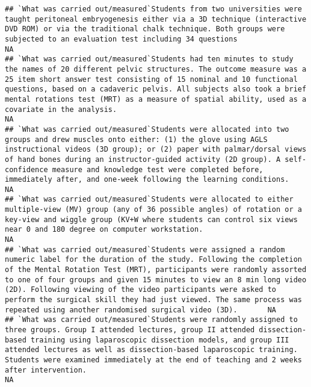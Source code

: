 \documentclass[]{article}
\begin{document}
\begin{verbatim}
## `What was carried out/measured`Students from two universities were taught peritoneal embryogenesis either via a 3D technique (interactive DVD ROM) or via the traditional chalk technique. Both groups were subjected to an evaluation test including 34 questions                                                                                                                                                                                                                    NA
## `What was carried out/measured`Students had ten minutes to study the names of 20 different pelvic structures. The outcome measure was a 25 item short answer test consisting of 15 nominal and 10 functional questions, based on a cadaveric pelvis. All subjects also took a brief mental rotations test (MRT) as a measure of spatial ability, used as a covariate in the analysis.                                                                                                 NA
## `What was carried out/measured`Students were allocated into two groups and drew muscles onto either: (1) the glove using AGLS instructional videos (3D group); or (2) paper with palmar/dorsal views of hand bones during an instructor-guided activity (2D group). A self-confidence measure and knowledge test were completed before, immediately after, and one-week following the learning conditions.                                                                            NA
## `What was carried out/measured`Students were allocated to either multiple-view (MV) group (any of 36 possible angles) of rotation or a key-view and wiggle group (KV+W where students can control six views near 0 and 180 degree on computer workstation.                                                                                                                                                                                                                            NA
## `What was carried out/measured`Students were assigned a random numeric label for the duration of the study. Following the completion of the Mental Rotation Test (MRT), participants were randomly assorted to one of four groups and given 15 minutes to view an 8 min long video (2D). Following viewing of the video participants were asked to perform the surgical skill they had just viewed. The same process was repeated using another randomised surgical video (3D).       NA
## `What was carried out/measured`Students were randomly assigned to three groups. Group I attended lectures, group II attended dissection-based training using laparoscopic dissection models, and group III attended lectures as well as dissection-based laparoscopic training. Students were examined immediately at the end of teaching and 2 weeks after intervention.                                                                                                             NA

\end{verbatim}
\end{document}
